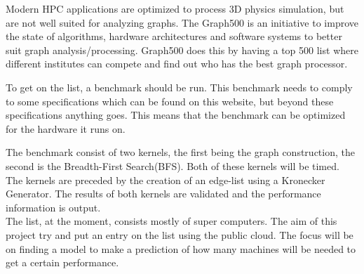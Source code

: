Modern HPC applications are optimized to process 3D physics simulation, but are not well suited for analyzing graphs. The Graph500 \cite{murphy2010introducing} is an initiative to improve the state of algorithms, hardware architectures and software systems to better suit graph analysis/processing. Graph500 does this by having a top 500 list where different institutes can compete and find out who has the best graph processor.

To get on the list, a benchmark should be run. This benchmark needs to comply to some specifications which can be found on this website\cite{graph500-specs}, but beyond these specifications anything goes. This means that the benchmark can be optimized for the hardware it runs on. 

The benchmark consist of two kernels, the first being the graph construction, the second is the Breadth-First Search(BFS). Both of these kernels will be timed. The kernels are preceded by the creation of an edge-list using a Kronecker Generator\cite{leskovec2010kronecker}. The results of both kernels are validated and the performance information is output.
\\
The list, at the moment, consists mostly of super computers. The aim of this project try and put an entry on the list using the public cloud. The focus will be on finding a model to make a prediction of how many machines will be needed to get a certain performance.